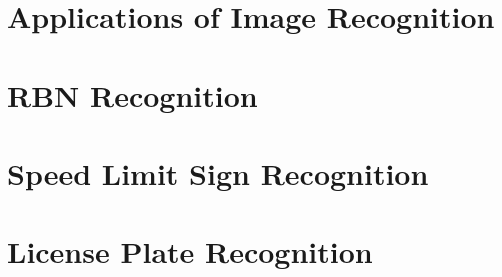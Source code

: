 \section{Applications of Image Recognition}
\label{sec:applications_of_image_recognition}




\section{RBN Recognition}

\cite{Fu:2015by}


\section{Speed Limit Sign Recognition}


\section{License Plate Recognition}

